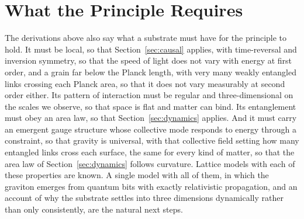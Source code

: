 \documentclass[aps,prd,onecolumn,nofootinbib,superscriptaddress]{revtex4-2}
\begin{document}
\section{What the Principle Requires}
\label{sec:requirements}

The derivations above also say what a substrate must have for the principle to hold. It must be local, so that Section~\ref{sec:causal} applies, with time-reversal and inversion symmetry, so that the speed of light does not vary with energy at first order, and a grain far below the Planck length, with very many weakly entangled links crossing each Planck area, so that it does not vary measurably at second order either. Its pattern of interaction must be regular and three-dimensional on the scales we observe, so that space is flat and matter can bind. Its entanglement must obey an area law, so that Section~\ref{sec:dynamics} applies. And it must carry an emergent gauge structure whose collective mode responds to energy through a constraint, so that gravity is universal, with that collective field setting how many entangled links cross each surface, the same for every kind of matter, so that the area law of Section~\ref{sec:dynamics} follows curvature. Lattice models with each of these properties are known. A single model with all of them, in which the graviton emerges from quantum bits with exactly relativistic propagation, and an account of why the substrate settles into three dimensions dynamically rather than only consistently, are the natural next steps.
\end{document}
